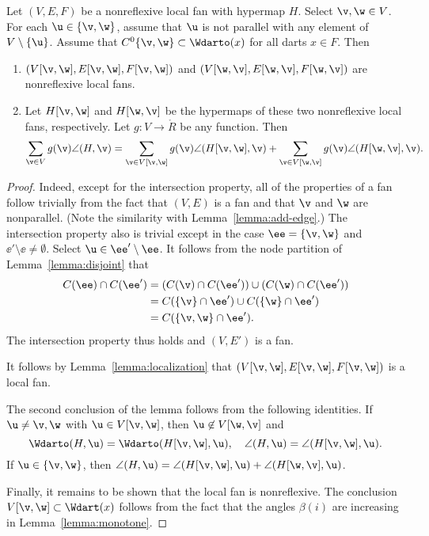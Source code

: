 \begin{lemma}[slicing]\label{lemma:slice} Let
$(V,E,F)$ be a nonreflexive local fan with hypermap $H$.  Select $\v,\w\in V$. For
each $\u\in \{\v,\w\}$, assume that $\u$ is not parallel with  any
element of $V\setminus\{\u\}$.  Assume that $C^0\{\v,\w\}\subset
\Wdarto(x)$ for all darts $x\in F$.  Then
\begin{enumerate}\wasitemize 
\item $(V[\v,\w],E[\v,\w],F[\v,\w])$ and
$(V[\w,\v],E[\w,\v],F[\w,\v])$ are nonreflexive local fans.
\item Let $H[\v,\w]$ and $H[\w,\v]$ be the hypermaps of these two
  nonreflexive local fans, respectively.  Let $g:V\to\ring{R}$ be any
  function.  Then
\[ 
  \sum_{\v\in V} g(\v)\angle(H,\v) 
  = \sum_{\v\in V[\v,\w]}g(\v)\angle(H[\v,\w],\v) 
  + \sum_{\v\in V[\w,\v]}g(\v)\angle(H[\w,\v],\v).
\] 
\end{enumerate}\wasitemize 
\end{lemma}
%
%

\begin{proof} 
Indeed, except for the intersection property, all of the properties
of a fan follow trivially from the fact that $(V,E)$ is a fan and
that $\v$ and $\w$ are nonparallel.  (Note the similarity with
Lemma~\ref{lemma:add-edge}.)  The intersection property also is
trivial except in the case $\ee=\{\v,\w\}$ and $\ee'\setminus \ee\ne
\emptyset$.  Select $\u\in \ee'\setminus\ee$.  It follows from the
node partition of Lemma~\ref{lemma:disjoint} that
\begin{align*}
C(\ee) \cap C(\ee') &= (C(\v) \cap C(\ee')) \cup (C(\w)\cap C(\ee')) \\
&= C(\{\v\}\cap \ee') \cup C(\{\w\}\cap \ee') \\
&= C(\{\v,\w\}\cap \ee').
\end{align*}
The intersection property thus holds and $(V,E')$ is a fan.

It follows by Lemma~\ref{lemma:localization} that
$(V[\v,\w],E[\v,\w],F[\v,\w])$ is a local fan.

The second conclusion of the lemma follows from the following identities.
If $\u\ne \v,\w$ with $\u\in V[\v,\w]$, then $\u\not\in V[\w,\v]$ and 
\begin{equation}
\Wdarto(H,\u)=\Wdarto(H[\v,\w],\u),\quad \angle(H,\u) = \angle(H[\v,\w],\u).
\end{equation}
If $\u\in\{\v,\w\}$, then 
$\angle(H,\u)=\angle(H[\v,\w],\u) +\angle(H[\w,\v],\u)$.

Finally, it remains to be shown that the local fan is nonreflexive.
The conclusion $V[\v,\w]\subset \Wdart(x)$ follows from the
fact that the angles $\beta(i)$ are increasing in
Lemma~\ref{lemma:monotone}.
\end{proof}

